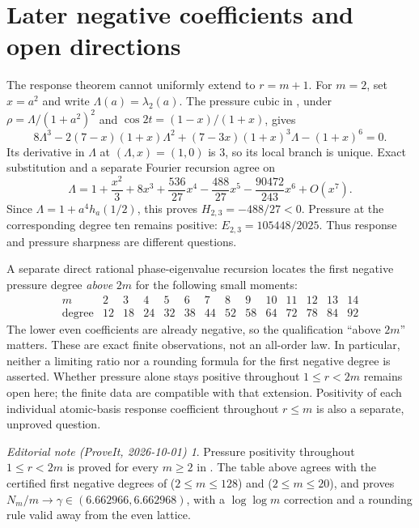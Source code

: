 \documentclass[11pt,a4paper]{article}
\theoremstyle{remark}\newtheorem*{ednote}{Editorial note (ProveIt, 2026-10-01)}
\begin{document}
\section{Later negative coefficients and open directions}
The response theorem cannot uniformly extend to $r=m+1$. For $m=2$, set $x=a^2$ and write $\Lambda(a)=\lambda_2(a)$. The pressure cubic in \cite{integer}, under $\rho=\Lambda/(1+a^2)^2$ and $\cos2t=(1-x)/(1+x)$, gives
\[
 8\Lambda^3-2(7-x)(1+x)\Lambda^2
 +(7-3x)(1+x)^3\Lambda-(1+x)^6=0.
\]
Its derivative in $\Lambda$ at $(\Lambda,x)=(1,0)$ is $3$, so its local branch is unique. Exact substitution and a separate Fourier recursion agree on
\[
 \Lambda=1+\frac{x^2}{3}+8x^3+\frac{536}{27}x^4
             -\frac{488}{27}x^5-\frac{90472}{243}x^6+O(x^7).
\]
Since $\Lambda=1+a^4h_a(1/2)$, this proves $H_{2,3}=-488/27<0$. Pressure at the corresponding degree ten remains positive: $E_{2,3}=105448/2025$. Thus response and pressure sharpness are different questions.

A separate direct rational phase-eigenvalue recursion locates the first negative pressure degree \emph{above} $2m$ for the following small moments:
\[
\begin{array}{c|rrrrrrrrrrrrr}
 m&2&3&4&5&6&7&8&9&10&11&12&13&14\\\hline
 \text{degree}&12&18&24&32&38&44&52&58&64&72&78&84&92
\end{array}
\]
The lower even coefficients are already negative, so the qualification ``above $2m$'' matters. These are exact finite observations, not an all-order law. In particular, neither a limiting ratio nor a rounding formula for the first negative degree is asserted. Whether pressure alone stays positive throughout $1\le r<2m$ remains open here; the finite data are compatible with that extension. Positivity of each individual atomic-basis response coefficient throughout $r\le m$ is also a separate, unproved question.
\begin{ednote}
Pressure positivity throughout $1\le r<2m$ is proved for every $m\ge2$ in
. The table above agrees with the certified first negative degrees
of  ($2\le m\le128$) and 
($2\le m\le20$), and  proves $N_m/m\to\gamma\in(6.662966,6.662968)$,
with a $\log\log m$ correction and a rounding rule valid away from the even lattice.
\end{ednote}
\end{document}
